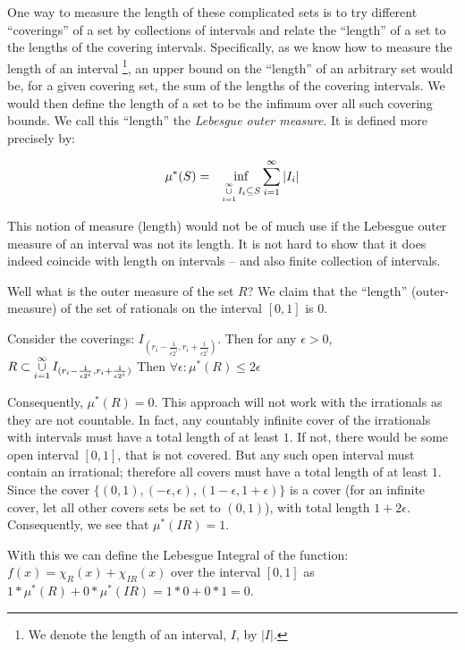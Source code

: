 \documentclass{article}
\begin{document}
One way to measure the length of these complicated sets is to try different ``coverings'' 
of a set by collections of intervals and relate the ``length'' of a set to the lengths of
the covering intervals. Specifically, as
we know how to measure the length of an interval%
\footnote{We denote the length of an interval, $I$, by $|I|$.}, an upper bound on 
the ``length'' of an arbitrary set would be, for a given covering set, 
the sum of the lengths of the covering intervals.
We would then define the length of a set to be the infimum over all such covering bounds.
We call this ``length'' the {\em Lebesgue outer measure\/}. It is defined more precisely by:

\begin{eqnarray}
	\mu^*(S) & = & \inf_{\mathop{\cup}_{i=1}^\infty\limits I_i \subseteq S} \sum_{i=1}^\infty |I_i| 
\end{eqnarray}

This notion of measure (length) would not be of much use if the Lebesgue outer measure of
an interval was not its length.
It is not hard to show that it does indeed coincide with length on 
intervals -- and also finite collection of intervals.

Well what is the outer measure of the set $R$? We claim that the ``length'' 
(outer-measure) of the set of rationals on the interval $[0,1]$ is $0$.

Consider the coverings: $I_{(r_i - \frac{1}{\epsilon 2^i}, r_i + \frac{1}{\epsilon 2^i})}$. 
Then for any
$\epsilon > 0$, $R \subset \mathop{\cup}_{i=1}^\infty\limits I_{(r_i - \frac{1}{\epsilon 2^i}, r_i + \frac{1}{\epsilon 2^i})}$
Then $\forall \epsilon: \mu^*(R) \le 2 \epsilon$

Consequently, $\mu^*(R) = 0$. This approach will not work with the irrationals 
as they are not countable. In fact, any countably infinite cover of the 
irrationals with intervals must have a total length of at least $1$. 
If not, there would be some open interval  $[0,1]$, that is not covered. 
But any such open 
interval must contain an irrational; therefore all covers must have a total length 
of at least $1$. Since the cover $\{(0,1), (-\epsilon, \epsilon), (1 - \epsilon,1 + \epsilon)\}$
is a cover (for an infinite cover, let all other covers sets be set 
to $(0,1)$), with total length $1 + 2 \epsilon$.
Consequently, we see that $\mu^*(IR) = 1$.

With this we can define the Lebesgue Integral of the function: 
$f(x) = \chi_{R}(x) + \chi_{IR}(x)$ over the interval $[0,1]$ 
as $1 * \mu^*(R) + 0 * \mu^*(IR) = 1 * 0 + 0 * 1 = 0$.
\end{document}
